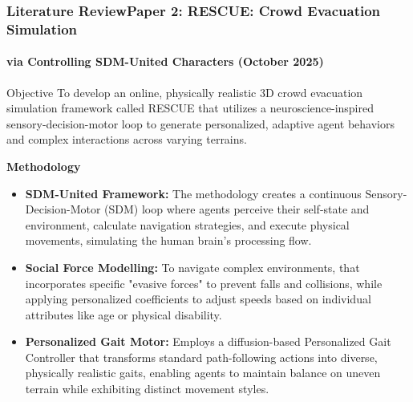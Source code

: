 \documentclass{beamer}
\begin{document}
\begin{frame}
\frametitle{Literature Review\newline Paper 2: RESCUE: Crowd Evacuation Simulation}
\framesubtitle{via Controlling SDM-United Characters (October 2025)}
\scriptsize

\begin{block}{Objective}
To develop an online, physically realistic 3D crowd evacuation simulation framework called RESCUE that utilizes a neuroscience-inspired sensory-decision-motor loop to generate personalized, adaptive agent behaviors and complex interactions across varying terrains.
\end{block}



\textbf{Methodology}
\begin{itemize}
    \item \textbf{SDM-United Framework:} The methodology creates a continuous Sensory-Decision-Motor (SDM) loop where agents perceive their self-state and environment, calculate navigation strategies, and execute physical movements, simulating the human brain's processing flow.
    \item \textbf{Social Force Modelling:} To navigate complex environments, that incorporates specific "evasive forces" to prevent falls and collisions, while applying personalized coefficients to adjust speeds based on individual attributes like age or physical disability.
    \item \textbf{Personalized Gait Motor:} Employs a diffusion-based Personalized Gait Controller that transforms standard path-following actions into diverse, physically realistic gaits, enabling agents to maintain balance on uneven terrain while exhibiting distinct movement styles.
\end{itemize}
\end{frame}
\end{document}
